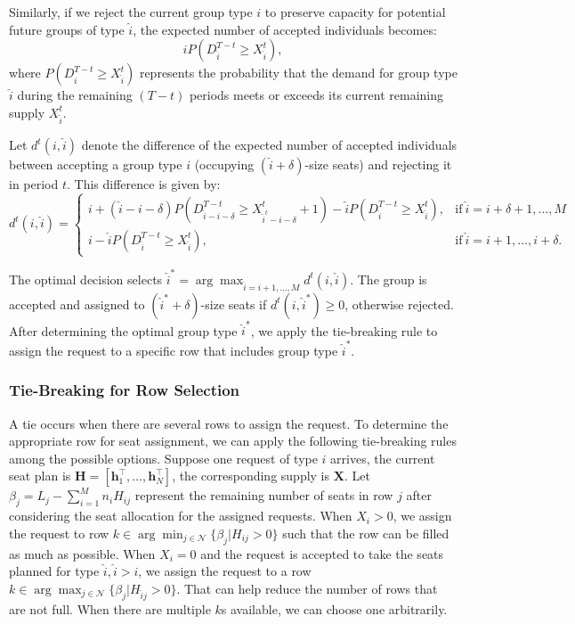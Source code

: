 Similarly, if we reject the current group type $i$ to preserve capacity for potential future groups of type $\hat{i}$, the expected number of accepted individuals becomes: $$\hat{i} P(D_{\hat{i}}^{T-t} \geq X_{\hat{i}}^{t}),$$ where $P(D_{\hat{i}}^{T-t} \geq X_{\hat{i}}^{t})$ represents the probability that the demand for group type $\hat{i}$ during the remaining $(T-t)$ periods meets or exceeds its current remaining supply $X_{\hat{i}}^{t}$.

Let $d^{t}({i},\hat{i})$ denote the difference of the expected number of accepted individuals between accepting a group type ${i}$ (occupying $(\hat{i}+\delta)$-size seats) and rejecting it in period $t$. This difference is given by:
\begin{equation*}
	d^{t}({i},\hat{i}) = \begin{cases}
    {i} + (\hat{i}-{i}-\delta)P(D_{\hat{i}-{i}-\delta}^{T-t} \geq X_{\hat{i}^{t}-{i}-\delta}^{t}+1) - \hat{i} P(D_{\hat{i}}^{T-t} \geq X_{\hat{i}}^{t}), &\text{if}~ \hat{i} = {i}+\delta+1, \ldots, M \\
    {i} - \hat{i} P(D_{\hat{i}}^{T-t} \geq X_{\hat{i}}^{t}), &\text{if}~ \hat{i} = {i}+1, \ldots, {i}+\delta.
		\end{cases}
\end{equation*}

The optimal decision selects $\hat{i}^{*} = \arg \max_{\hat{i} = {i}+1, \ldots, M} d^{t}({i},\hat{i})$. The group is accepted and assigned to $(\hat{i}^{*} + \delta)$-size seats if $d^{t}({i},\hat{i}^{*}) \geq 0$, otherwise rejected. After determining the optimal group type $\hat{i}^{*}$, we apply the tie-breaking rule to assign the request to a specific row that includes group type $\hat{i}^{*}$.


\subsubsection*{Tie-Breaking for Row Selection}\label{tie-break}
A tie occurs when there are several rows to assign the request. To determine the appropriate row for seat assignment, we can apply the following tie-breaking rules among the possible options. Suppose one request of type ${i}$ arrives, the current seat plan is $\bm{H} = [\bm{h}_{1}^{\intercal}, \ldots, \bm{h}_{N}^{\intercal}]$, the corresponding supply is $\bm{X}$. Let $\beta_{j} = L_j - \sum_{i =1}^{M} n_{i} H_{ij}$ represent the remaining number of seats in row $j$ after considering the seat allocation for the assigned requests. When $X_{i} > 0$, we assign the request to row $k \in \arg \min_{j \in \mathcal{N}} \{\beta_{j}|H_{ij} > 0\}$ such that the row can be filled as much as possible. When $X_{i} = 0$ and the request is accepted to take the seats planned for type $\hat{i}, \hat{i}>i$, we assign the request to a row $k \in \arg \max_{j \in \mathcal{N}} \{\beta_{j}| H_{\hat{i} j}>0\}$. That can help reduce the number of rows that are not full. When there are multiple $k$s available, we can choose one arbitrarily. 

